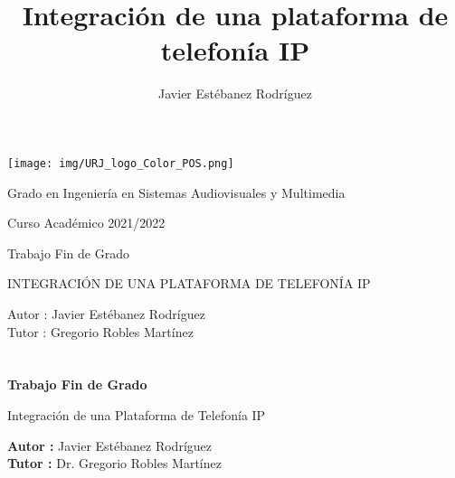 \documentclass[a4paper, 12pt]{book}
\title{Integración de una plataforma de telefonía IP}
\author{Javier Estébanez Rodríguez}
\begin{document}
\renewcommand{\refname}{Bibliografía}  %
\renewcommand{\appendixname}{Apéndice}


\begin{titlepage}
\begin{center}
\texttt{[image: img/URJ\_logo\_Color\_POS.png]}

\vspace{1.75cm}

\Large
Grado en Ingeniería en Sistemas Audiovisuales y Multimedia

\vspace{0.4cm}

\large
Curso Académico 2021/2022

\vspace{0.8cm}

Trabajo Fin de Grado

\vspace{2.5cm}

\LARGE
INTEGRACIÓN DE UNA PLATAFORMA DE TELEFONÍA IP

\vspace{4cm}

\large
Autor : Javier Estébanez Rodríguez \\
Tutor : Gregorio Robles Martínez
\end{center}
\end{titlepage}

\newpage
\mbox{}
\thispagestyle{empty} %


\clearpage
{}
\chapter*{}

\vspace{-4cm}
\begin{center}
\LARGE
\textbf{Trabajo Fin de Grado}

\vspace{1cm}
\large
Integración de una Plataforma de Telefonía IP

\vspace{1cm}
\large
\textbf{Autor :} Javier Estébanez Rodríguez \\
\textbf{Tutor :} Dr. Gregorio Robles Martínez

\end{center}
\end{document}
